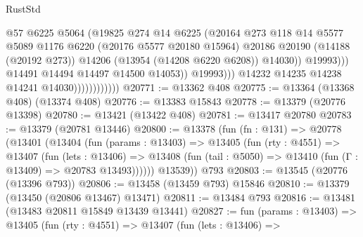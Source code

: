 \begin{lexlean}{RustStd}
\begin{coremodule}
                                            @57
                                            @6225
                                            @5064
                                            (@19825
                                              @274
                                              @14
                                              @6225
                                              (@20164
                                                @273
                                                @118
                                                @14
                                                @5577
                                                @5089
                                                @1176
                                                @6220
                                                (@20176 @5577 @20180 @15964)
                                                @20186
                                                @20190
                                                (@14188 (@20192 @273))
                                                @14206
                                                (@13954 (@14208 @6220 @6208))
                                                @14030))
                                            @19993)))
                                      @14491
                                      @14494
                                      @14497
                                      @14500
                                      @14053))
                                  @19993)))
                            @14232
                            @14235
                            @14238
                            @14241
                            @14030))))))))))))
@20771 := @13362 @408
@20775 := @13364 (@13368 @408) (@13374 @408)
@20776 := @13383 @15843
@20778 := @13379 (@20776 @13398)
@20780 := @13421 (@13422 @408)
@20781 := @13417 @20780
@20783 := @13379 (@20781 @13446)
@20800 := @13378
    (fun (fn : @131) =>
    @20778
      (@13401
        (@13404
          (fun (params : @13403) =>
          @13405
            (fun (rty : @4551) =>
            @13407
              (fun (lets : @13406) =>
              @13408 (fun (tail : @5050) => @13410 (fun (Γ : @13409) => @20783 @13493))))))
        @13539))
    @793
@20803 := @13545 (@20776 (@13396 @793))
@20806 := @13458 (@13459 @793) @15846
@20810 := @13379 (@13450 (@20806 @13467) @13471)
@20811 := @13484 @793
@20816 := @13481 (@13483 @20811 @15849 @13439 @13441)
@20827 := fun (params : @13403) =>
  @13405
    (fun (rty : @4551) =>
    @13407
      (fun (lets : @13406) =>

\end{coremodule}
\end{lexlean}
